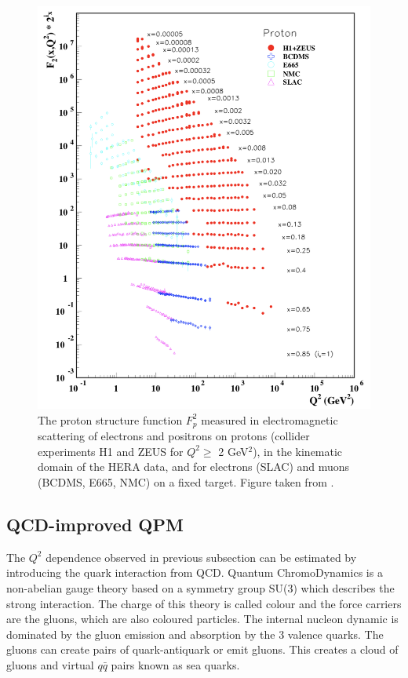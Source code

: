 \begin{figure}[!h]
  \centering
	\includegraphics[scale=0.65]{./gfx/F2.png}
	\caption{The proton structure function $F^2_p$ measured in electromagnetic scattering of electrons and positrons on protons (collider experiments H1 and ZEUS for $Q^2 \geq$ 2 GeV$^2$), in the kinematic domain of the HERA data, and for electrons (SLAC) and muons (BCDMS, E665, NMC) on a fixed target. Figure taken from \cite{PDG}.}
	\label{pic:F2}
\end{figure}

\subsection{QCD-improved QPM}

The $Q^2$ dependence observed in previous subsection can be estimated by introducing the quark interaction from QCD.
Quantum ChromoDynamics is a non-abelian gauge theory based on a symmetry group SU(3) which describes the strong interaction.
The charge of this theory is called colour and the force carriers are the gluons, which are also coloured particles. The
internal nucleon dynamic is dominated by the gluon emission and absorption by the 3 valence quarks. The gluons can create
pairs of quark-antiquark or emit gluons. This creates a cloud of gluons and virtual $q\bar{q}$ pairs known as sea quarks.

